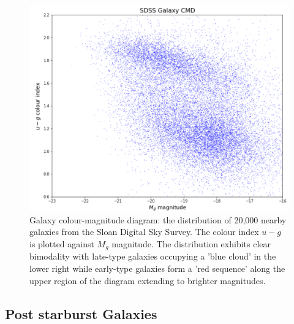 \begin{figure}
	\includegraphics[width=\columnwidth]{images/CMDs/galaxyCMD.PNG}
    \caption[Galaxy CMD]{Galaxy colour-magnitude diagram: the distribution of 20,000 nearby galaxies from the Sloan Digital Sky Survey. The colour index $u-g$ is plotted against $M_g$ magnitude. The distribution exhibits clear bimodality with late-type galaxies occupying a 'blue cloud' in the lower right while early-type galaxies form a 'red sequence' along the upper region of the diagram extending to brighter magnitudes.}
    \label{fig:CMD1}
\end{figure}

\subsection{Post starburst Galaxies}

